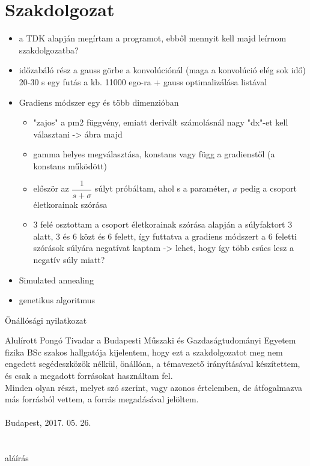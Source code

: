 \documentclass[12pt]{article}
\begin{document}
\section*{Szakdolgozat}
\begin{itemize}
	\item a TDK alapján megírtam a programot, ebből mennyit kell majd leírnom szakdolgozatba?
	\item időzabáló rész a gauss görbe a konvolúciónál (maga a konvolúció elég sok idő) 20-30 s egy futás a kb. 11000 ego-ra + gauss optimalizálása listával
	\item Gradiens módszer egy és több dimenzióban
	\begin{itemize}
		\item "zajos" a pm2 függvény, emiatt derivált számolásnál nagy "dx"-et kell választani -> ábra majd
		\item gamma helyes megválasztása, konstans vagy függ a gradienstől (a konstans működött)
		\item először az $\dfrac{1}{s + \sigma}$ súlyt próbáltam, ahol s a paraméter, $\sigma$ pedig a csoport életkorainak szórása
		\item 3 felé osztottam a csoport életkorainak szórása alapján a súlyfaktort 3 alatt, 3 és 6 közt és 6 felett, így futtatva a gradiens módszert a 6 feletti szórások súlyára negatívat kaptam -> lehet, hogy így több csúcs lesz a negatív súly miatt?
	\end{itemize}
	\item Simulated annealing
	\item genetikus algoritmus
\end{itemize}
\fi


\pagebreak
\begin{center}
	{\Huge Önállósági nyilatkozat}
\end{center}
\medskip
Alulírott Pongó Tivadar a Budapesti Műszaki és Gazdaságtudományi Egyetem fizika BSc szakos hallgatója kijelentem, hogy ezt a szakdolgozatot meg nem engedett segédeszközök nélkül, önállóan, a témavezető irányításával készítettem, és csak a megadott forrásokat használtam fel. \\
Minden olyan részt, melyet szó szerint, vagy azonos értelemben, de átfogalmazva más forrásból vettem, a forrás megadásával jelöltem.\\\\
Budapest, 2017. 05. 26. \\ \\ \\ %
\hspace*{100mm}aláírás %
\pagebreak
\tableofcontents
\pagebreak
\end{document}
